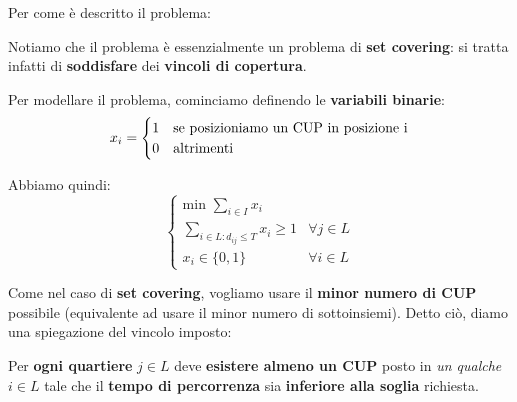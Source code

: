 Per come è descritto il problema:

\begin{remark}
    Notiamo che il problema è essenzialmente un problema
    di \textbf{set covering}: si tratta infatti di \textbf{soddisfare} 
    dei \textbf{vincoli di copertura}.
\end{remark}

Per modellare il problema, cominciamo definendo le \textbf{variabili binarie}:
\[
    x_i = \begin{cases}
        1 & \text{se posizioniamo un CUP in posizione } $i$ \\ 
        0 & \text{altrimenti}
    \end{cases}
\]

Abbiamo quindi:
\[
    \begin{cases}
        \displaystyle\text{min } \sum_{i\in I} x_i \\ 
        \displaystyle\sum_{i\in L : d_{ij} \le T} x_i \ge 1 & \forall j \in L \\
        x_i \in \{0,1\} & \forall i \in L
    \end{cases}
\]

Come nel caso di \textbf{set covering}, vogliamo usare il \textbf{minor numero di CUP}
possibile (equivalente ad usare il minor numero di sottoinsiemi).
Detto ciò, diamo una spiegazione del vincolo imposto:

\begin{remark}
    Per \textbf{ogni quartiere} $j\in L$ deve \textbf{esistere almeno un CUP}
    posto in \textit{un qualche} $i\in L$ tale che il \textbf{tempo di percorrenza}
    sia \textbf{inferiore alla soglia} richiesta.
\end{remark}
